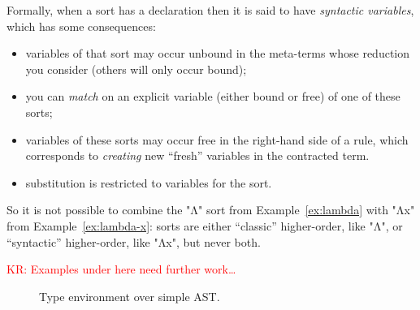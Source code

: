\documentclass[letterpaper,11pt]{article}
\newcommand{\KR}[1]{\textcolor{red}{KR: #1}}
\begin{document}
Formally, when a sort has a  declaration then it is said to have \emph{syntactic
  variables}, which has some consequences:
\begin{itemize}

\item variables of that sort may occur unbound in the meta-terms whose reduction you consider
  (others will only occur bound);

\item you can \emph{match} on an explicit variable (either bound or free) of one of these sorts;

\item variables of these sorts may occur free in the right-hand side of a rule, which corresponds to
  \emph{creating} new ``fresh'' variables in the contracted term.

\item substitution is restricted to variables for the sort.

\end{itemize}
So it is not possible to combine the "Λ" sort from Example~\ref{ex:lambda} with "Λx" from
Example~\ref{ex:lambda-x}: sorts are either ``classic'' higher-order, like "Λ", or ``syntactic''
higher-order, like "Λx", but never both.





\KR{Examples under here need further work…}

\begin{figure}[h!t]
  \caption{Type environment over simple AST.}
  \label{fig:te}
\end{figure}
\end{document}
